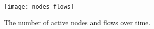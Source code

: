 
\begin{figure}[!t]
\vspace{0.5em}
\begin{center}
\texttt{[image: nodes-flows]}%
\vspace{-1.25em}%
\caption{The number of active nodes and flows over time.} 
\label{fig:nodes-flows}
\end{center}
\vspace{-1.3em}
\end{figure}
